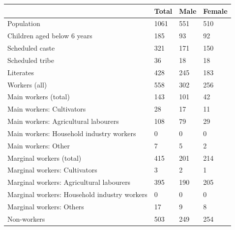 \documentclass{article}
\begin{document}
\begin{tabular}{llll}
\toprule
 & Total & Male & Female \\
\midrule
Population & 1061 & 551 & 510 \\
Children aged below 6 years & 185 & 93 & 92 \\
Scheduled caste & 321 & 171 & 150 \\
Scheduled tribe & 36 & 18 & 18 \\
Literates & 428 & 245 & 183 \\
Workers (all) & 558 & 302 & 256 \\
Main workers (total) & 143 & 101 & 42 \\
Main workers: Cultivators & 28 & 17 & 11 \\
Main workers: Agricultural labourers & 108 & 79 & 29 \\
Main workers: Household industry workers & 0 & 0 & 0 \\
Main workers: Other & 7 & 5 & 2 \\
Marginal workers (total) & 415 & 201 & 214 \\
Marginal workers: Cultivators & 3 & 2 & 1 \\
Marginal workers: Agricultural labourers & 395 & 190 & 205 \\
Marginal workers: Household industry workers & 0 & 0 & 0 \\
Marginal workers: Others & 17 & 9 & 8 \\
Non-workers & 503 & 249 & 254 \\
\bottomrule
\end{tabular}
\end{document}
